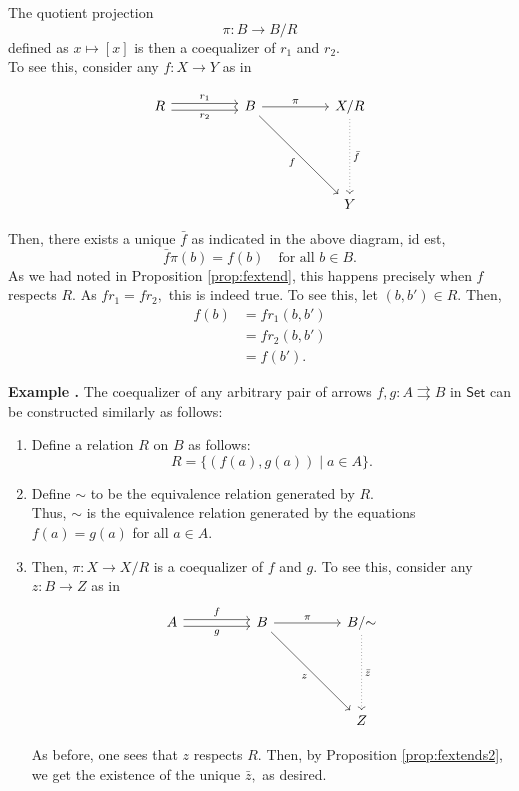 \documentclass[11pt,leqno,landscape,semhelv]{seminar}
\theoremstyle{definition}
\numberwithin{joke}{section}
\numberwithin{thm}{section}
\numberwithin{equation}{section}
\newcommand{\example}[1]{\refstepcounter{thm}\par\medskip
   {\textbf{Example \thethm.} #1} \rmfamily}
\newcommand{\tto}{\rightrightarrows}
\begin{document}
The quotient projection 
\begin{equation*} 
  \pi:B \to B/R
\end{equation*}
defined as $x \mapsto [x]$ is then a coequalizer of $r_1$ and $r_2.$\\
To see this, consider any $f:X \to Y$ as in

\begin{equation*} 
  \begin{tikzcd}
  R \arrow[rr, "r_1", shift left] \arrow[rr, "r_2"', shift right]&& 
  B \arrow[rr, "\pi"] \arrow[rrddd, "f"'] &  & X/R \arrow[ddd, "\bar{f}", dotted] \\&&&&\\&&&&\\
  &&&& Y  
  \end{tikzcd}
\end{equation*}

Then, there exists a unique $\bar{f}$ as indicated in the above diagram, id est, 
\begin{equation*}   
  \bar{f}\pi(b) = f(b) \quad \text{for all } b \in B.
\end{equation*}
As we had noted in Proposition \ref{prop:fextend}, this happens precisely when $f$ respects $R.$ As $fr_1 = fr_2,$ this is indeed true. To see this, let $(b, b') \in R.$ Then,
\begin{align*} 
  f(b) &= fr_1(b, b')\\
  &= fr_2(b, b')\\
  &= f(b').
\end{align*}

\example{} The coequalizer of any arbitrary pair of arrows $f, g:A\tto B$ in $\mathsf{Set}$ can be constructed similarly as follows:
\begin{enumerate}
  \item Define a relation $R$ on $B$ as follows:
  \begin{equation*} 
    R = \{(f(a), g(a)) \mid a \in A\}.
  \end{equation*}
  \item Define $\sim$ to be the equivalence relation generated by $R.$\\
  Thus, $\sim$ is the equivalence relation generated by the equations $f(a) = g(a)$ for all $a \in A.$
  \item Then, $\pi:X \to X/R$ is a coequalizer of $f$ and $g.$ To see this, consider any $z:B \to Z$ as in
  \begin{equation*} 
    \begin{tikzcd}
    A \arrow[rr, "f", shift left] \arrow[rr, "g"', shift right] &  & B \arrow[rr, "\pi"] \arrow[rrddd, "z"'] &  & B/{\sim} \arrow[ddd, "\bar{z}", dotted] \\
    &&&&\\&&&&\\
    &&&& Z       
    \end{tikzcd}
  \end{equation*}

  As before, one sees that $z$ respects $R.$ Then, by Proposition \ref{prop:fextends2}, we get the existence of the unique $\bar{z},$ as desired.
\end{enumerate}
\end{document}
